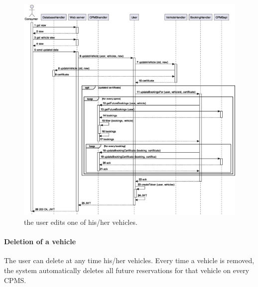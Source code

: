 \begin{figure}[h!]
    \centering
    \includegraphics[width=\columnwidth]{./images/sequences/emsp/vehicle_edit}
    \caption{the user edits one of his/her vehicles.}
\end{figure}

\pagebreak

\paragraph{Deletion of a vehicle} The user can delete at any time his/her vehicles. Every time a vehicle is removed, the system automatically deletes all future reservations for that vehicle on every CPMS.

